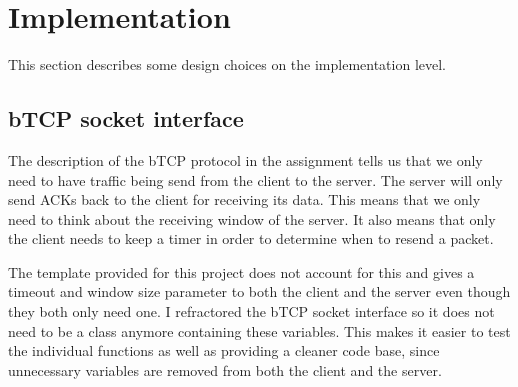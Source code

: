 \documentclass[a4paper]{article}
\begin{document}
\section{Implementation}
This section describes some design choices on the implementation level.

	\subsection{bTCP socket interface}
	The description of the bTCP protocol in the assignment tells us that we only need to have traffic being send from the client to the server. The server will only send ACKs back to the client for receiving its data. This means that we only need to think about the receiving window of the server. It also means that only the client needs to keep a timer in order to determine when to resend a packet.

	The template provided for this project does not account for this and gives a timeout and window size parameter to both the client and the server even though they both only need one. I refractored the bTCP socket interface so it does not need to be a class anymore containing these variables. This makes it easier to test the individual functions as well as providing a cleaner code base, since unnecessary variables are removed from both the client and the server.
\end{document}
